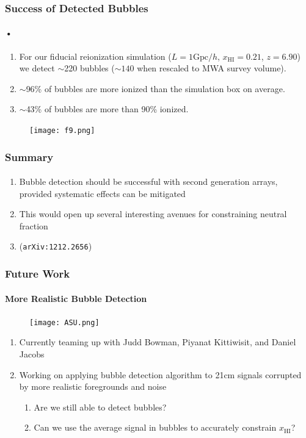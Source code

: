 \documentclass{beamer}
\newcommand{\gpch}{\text{Gpc}/h}
\begin{document}
\begin{frame}
\frametitle{Success of Detected Bubbles}
\framesubtitle{•}
\begin{enumerate}[-]
\item For our fiducial reionization simulation ($L = 1\gpch$, $x_{\text{HI}} = 0.21$, $z = 6.90$) we detect $\sim$220 bubbles ($\sim140$ when rescaled to MWA survey volume).
\item $\sim$96\% of bubbles are more ionized than the simulation box on average.
\item $\sim$43\% of bubbles are more than 90\% ionized.
\end{enumerate}
\begin{figure}[h]
  \centering
  \texttt{[image: f9.png]}
\end{figure}
\end{frame}

\begin{frame}
\frametitle{Summary}
\framesubtitle{}
\begin{enumerate}[-]
\item Bubble detection should be successful with second generation arrays, provided systematic effects can be mitigated
\item This would open up several interesting avenues for constraining neutral fraction
\item ({\tt arXiv:1212.2656})
\end{enumerate}
\end{frame}

\begin{frame}
\frametitle{Future Work}
\framesubtitle{More Realistic Bubble Detection}
\begin{figure}[h]
  \centering
  \texttt{[image: ASU.png]}
\end{figure}
\begin{enumerate}[-]
\item Currently teaming up with Judd Bowman, Piyanat Kittiwisit, and Daniel Jacobs
\item Working on applying bubble detection algorithm to 21cm signals corrupted by more realistic foregrounds and noise
\begin{enumerate}[$\to$]
\item Are we still able to detect bubbles?
\item Can we use the average signal in bubbles to accurately constrain $x_{\text{HI}}$?
\end{enumerate}
\end{enumerate}
\end{frame}
\end{document}
